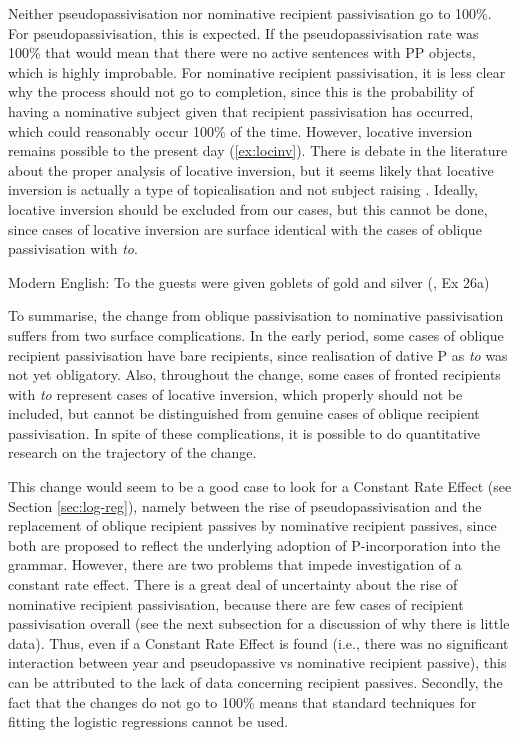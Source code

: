 	Neither pseudopassivisation nor nominative recipient passivisation go to 100\%. For pseudopassivisation, this is expected. If the pseudopassivisation rate was 100\% that would mean that there were no active sentences with PP objects, which is highly improbable. For nominative recipient passivisation, it is less clear why the process should not go to completion, since this is the probability of having a nominative subject given that recipient passivisation has occurred, which could reasonably occur 100\% of the time. However, locative inversion remains possible to the present day (\ref{ex:locinv}). There is debate in the literature about the proper analysis of locative inversion, but it seems likely that locative inversion is actually a type of topicalisation and not subject raising \citep{Bresnan.1994}. Ideally, locative inversion should be excluded from our cases, but this cannot be done, since cases of locative inversion are surface identical with the cases of oblique passivisation with \textit{to}.

	\begin{exe}
		\ex Modern English: To the guests were given goblets of gold and silver (\citealt{Bruening.2010}, Ex 26a)\label{ex:locinv}
	\end{exe}

	To summarise, the change from oblique passivisation to nominative passivisation suffers from two surface complications. In the early period, some cases of oblique recipient passivisation have bare recipients, since realisation of dative P as \textit{to} was not yet obligatory. Also, throughout the change, some cases of fronted recipients with \textit{to} represent cases of locative inversion, which properly should not be included, but cannot be distinguished from genuine cases of oblique recipient passivisation. In spite of these complications, it is possible to do quantitative research on the trajectory of the change.

	This change would seem to be a good case to look for a Constant Rate Effect (see Section \ref{sec:log-reg}), namely between the rise of pseudopassivisation and the replacement of oblique recipient passives by nominative recipient passives, since both are proposed to reflect the underlying adoption of P-incorporation into the grammar. However, there are two problems that impede investigation of a constant rate effect. There is a great deal of uncertainty about the rise of nominative recipient passivisation, because there are few cases of recipient passivisation overall (see the next subsection for a discussion of why there is little data). Thus, even if a Constant Rate Effect is found (i.e., there was no significant interaction between year and pseudopassive vs nominative recipient passive), this can be attributed to the lack of data concerning recipient passives. Secondly, the fact that the changes do not go to 100\% means that standard techniques for fitting the logistic regressions cannot be used.

